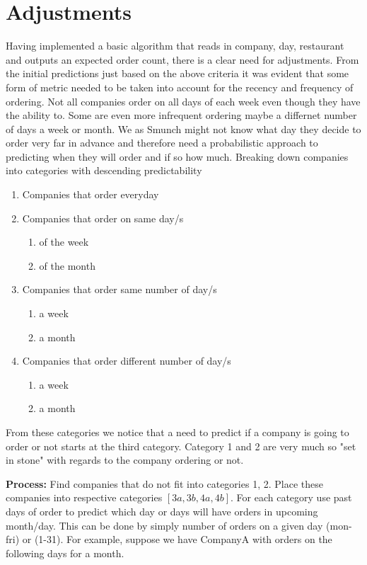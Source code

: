 \documentclass[12pt]{article}
\begin{document}
\section{Adjustments}
Having implemented a basic algorithm that reads in company, day, restaurant and outputs an expected order count, there is a clear need for adjustments. From the initial predictions just based on the above criteria it was evident that some form of metric needed to be taken into account for the recency and frequency of ordering. Not all companies order on all days of each week even though they have the ability to. Some are even more infrequent ordering maybe a differnet number of days a week or month. We as Smunch might not know what day they decide to order very far in advance and therefore need a probabilistic approach to predicting when they will order and if so how much. Breaking down companies into categories with descending predictability
\begin{enumerate}
   \item Companies that order everyday
   \item Companies that order on same day/s
   \begin{enumerate}
     \item of the week
     \item of the month
   \end{enumerate}
   \item Companies that order same number of day/s
   \begin{enumerate}
     \item a week
     \item a month
   \end{enumerate}
   \item Companies that order different number of day/s
   \begin{enumerate}
     \item a week
     \item a month
   \end{enumerate}
\end{enumerate}

From these categories we notice that a need to predict if a company is going to order or not starts at the third category. Category 1 and 2 are very much so "set in stone" with regards to the company ordering or not.

\textbf{Process:}
Find companies that do not fit into categories 1, 2. Place these companies into respective categories $[3a, 3b, 4a, 4b]$. For each category use past days of order to predict which day or days will have orders in upcoming month/day. This can be done by simply number of orders on a given day (mon-fri) or (1-31). For example, suppose we have CompanyA with orders on the following days for a month. 
\end{document}
